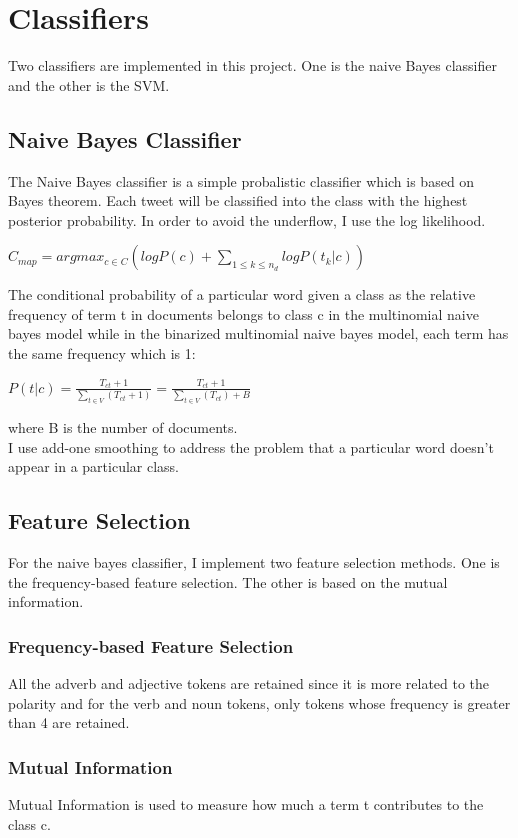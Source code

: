 \documentclass{article}
\begin{document}
\section{Classifiers}
Two classifiers are implemented in this project. One is the naive Bayes classifier and the other is the SVM. 
\subsection{Naive Bayes Classifier}
The Naive Bayes classifier is a simple probalistic classifier which is based on Bayes theorem. Each tweet will be classified into the class with the highest posterior probability. In order to avoid the underflow, I use the log likelihood.

\begin{center}
$C_{map} = argmax_{c \in C} (log P(c) + \sum_{1 \le k \le n_d} log P(t_k |c))$ 
\end{center}

\noindent The conditional probability of a particular word given a class as the relative frequency of term t in documents belongs to class c in the multinomial naive bayes model while in the binarized multinomial naive bayes model, each term has the same frequency which is 1:

\begin{center}
$P(t|c) = \frac{T_{ct} + 1}{\sum_{t \in V}(T_{ct} + 1)} = \frac{T_{ct} + 1}{\sum_{t \in V}(T_{ct}) + B}$
\end{center}

\noindent where B is the number of documents. \\
I use add-one smoothing to address the problem that a particular word doesn't appear in a particular class. \\
\subsection{Feature Selection}
For the naive bayes classifier, I implement two feature selection methods. One is the frequency-based feature selection. The other is based on the mutual information.
\subsubsection{Frequency-based Feature Selection}
All the adverb and adjective tokens are retained since it is more related to the polarity and for the verb and noun tokens, only tokens whose frequency is greater than 4 are retained. 
\subsubsection{Mutual Information}
Mutual Information is used to measure how much a term t contributes to the class c.
\end{document}
